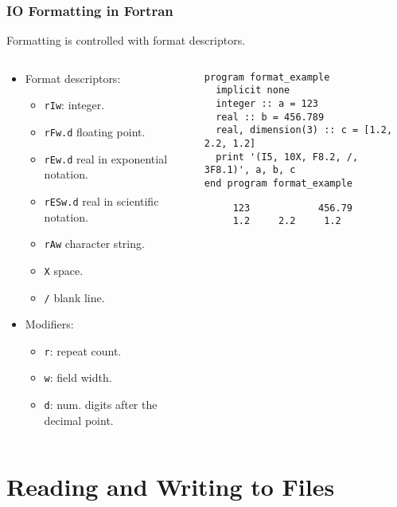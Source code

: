 \begin{frame}[fragile]
  \frametitle{IO Formatting in Fortran}
  Formatting is controlled with format descriptors.

    \begin{columns}[T]
    \begin{column}{0.5\textwidth}
  \begin{itemize}
    \item Format descriptors:
      \begin{itemize}
        \item \texttt{rIw}: integer.
        \item \texttt{rFw.d} floating point.
        \item \texttt{rEw.d} real in exponential notation.
        \item \texttt{rESw.d} real in scientific notation.
        \item \texttt{rAw} character string.
        \item \texttt{X} space.
        \item \texttt{/} blank line.
      \end{itemize}

    \item Modifiers:
      \begin{itemize}
        \item \texttt{r}: repeat count.
        \item \texttt{w}: field width.
        \item \texttt{d}: num. digits after the decimal point.
      \end{itemize}
  \end{itemize}
        \end{column}
    \begin{column}{0.5\textwidth}
  \begin{lstlisting}
program format_example
  implicit none
  integer :: a = 123
  real :: b = 456.789
  real, dimension(3) :: c = [1.2, 2.2, 1.2]
  print '(I5, 10X, F8.2, /, 3F8.1)', a, b, c
end program format_example
  \end{lstlisting}

  \begin{lstlisting}
     123            456.79
     1.2     2.2     1.2
  \end{lstlisting}
    \end{column}
    \end{columns}
\end{frame}


\section{Reading and Writing to Files}

